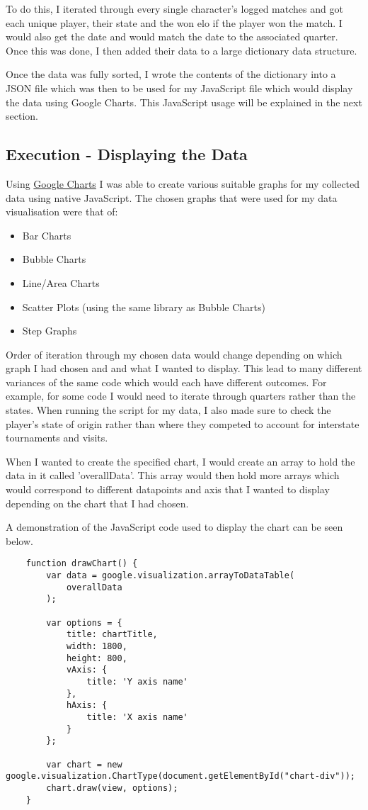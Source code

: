 \documentclass[11pt, oneside, a4paper]{article}
\begin{document}
To do this, I iterated through every single character's logged matches and got each unique player, their state and the won elo if the player won the match. I would also get the date and would match the date to the associated quarter. Once this was done, I then added their data to a large dictionary data structure.

Once the data was fully sorted, I wrote the contents of the dictionary into a JSON file which was then to be used for my JavaScript file which would display the data using Google Charts. This JavaScript usage will be explained in the next section.

\subsection{Execution - Displaying the Data}
Using \href{https://developers.google.com/chart}{Google Charts} I was able to create various suitable graphs for my collected data using native JavaScript. The chosen graphs that were used for my data visualisation were that of:
\begin{itemize}
	\item Bar Charts
	\item Bubble Charts
	\item Line/Area Charts
	\item Scatter Plots (using the same library as Bubble Charts)
	\item Step Graphs
\end{itemize}

Order of iteration through my chosen data would change depending on which graph I had chosen and and what I wanted to display. This lead to many different variances of the same code which would each have different outcomes. For example, for some code I would need to iterate through quarters rather than the states. When running the script for my data, I also made sure to check the player's state of origin rather than where they competed to account for interstate tournaments and visits. 

When I wanted to create the specified chart, I would create an array to hold the data in it called 'overallData'. This array would then hold more arrays which would correspond to different datapoints and axis that I wanted to display depending on the chart that I had chosen. 

A demonstration of the JavaScript code used to display the chart can be seen below.

\begin{lstlisting}    
    function drawChart() {
		var data = google.visualization.arrayToDataTable(
			overallData
		);
		
		var options = {
			title: chartTitle,
			width: 1800,
			height: 800,
			vAxis: {
				title: 'Y axis name'
			},
			hAxis: {
				title: 'X axis name'
			}
		};
									
		var chart = new google.visualization.ChartType(document.getElementById("chart-div"));
		chart.draw(view, options);
	}
\end{lstlisting}
\end{document}

